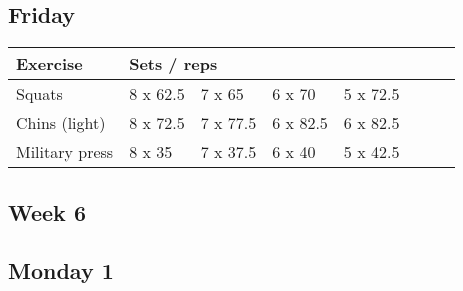 \documentclass[12pt, a4paper]{article}%
\begin{document}
  \subsection*{\hspace{0.5em} Friday }


  \begin{tabular}{l|lllllll}
  \hspace{0.75em} \textbf{Exercise} & \multicolumn{ 7 }{l}{ \textbf{Sets / reps} } \\ \hline

            \hspace{0.75em} Squats
            & 8 x 62.5
            & 7 x 65
            & 6 x 70
            & 5 x 72.5
            & 
            & 
            & 
            \\


            \hspace{0.75em} Chins (light)
            & 8 x 72.5
            & 7 x 77.5
            & 6 x 82.5
            & 6 x 82.5
            & 
            & 
            & 
            \\


            \hspace{0.75em} Military press
            & 8 x 35
            & 7 x 37.5
            & 6 x 40
            & 5 x 42.5
            & 
            & 
            & 
            \\


  \end{tabular}


\clearpage \subsection*{\hspace{0.25em} Week 6 }
  \subsection*{\hspace{0.5em} Monday 1 }
\end{document}
